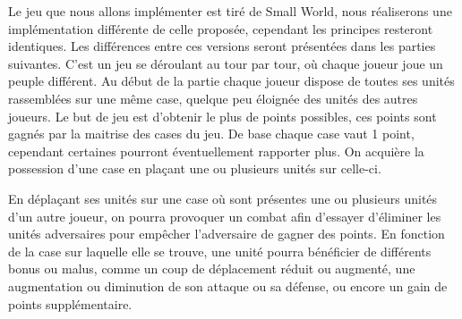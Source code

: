 Le jeu que nous allons implémenter est tiré de Small World, nous réaliserons une implémentation différente de celle proposée, cependant les principes resteront identiques. Les différences entre ces versions seront présentées dans les parties suivantes.
 C'est un jeu se déroulant au tour par tour, où chaque joueur joue un peuple différent. Au début de la partie chaque joueur dispose de toutes ses unités rassemblées sur une même case, quelque peu éloignée des unités des autres joueurs.
Le but de jeu est d'obtenir le plus de points possibles, ces points sont gagnés par la maitrise des cases du jeu. De base chaque case vaut 1 point, cependant certaines pourront éventuellement rapporter plus. On acquière la possession d'une case en plaçant une ou plusieurs unités sur celle-ci.

En déplaçant ses unités sur une case où sont présentes une ou plusieurs unités d'un autre joueur, on pourra provoquer un combat afin d'essayer d'éliminer les unités adversaires pour empêcher l'adversaire de gagner des points.
En fonction de la case sur laquelle elle se trouve, une unité pourra bénéficier de différents bonus ou malus, comme un coup de déplacement réduit ou augmenté, une augmentation ou diminution de son attaque ou sa défense, ou encore un gain de points supplémentaire.